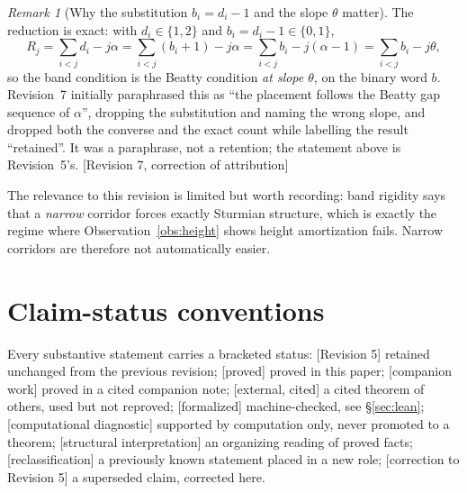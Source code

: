 \documentclass[11pt]{article}
\theoremstyle{plain}
\theoremstyle{definition}
\theoremstyle{remark}
\newtheorem{remark}[theorem]{Remark}
\newcommand{\al}{\alpha}
\newcommand{\status}[1]{\textsf{\footnotesize[#1]}}
\begin{document}
\begin{remark}[Why the substitution $b_i=d_i-1$ and the slope $\theta$ matter]\label{rem:bandslope}
The reduction is exact: with $d_i\in\{1,2\}$ and $b_i=d_i-1\in\{0,1\}$,
\[
R_j=\textstyle\sum_{i<j}d_i-j\al=\sum_{i<j}(b_i+1)-j\al=\sum_{i<j}b_i-j(\al-1)=\sum_{i<j}b_i-j\theta,
\]
so the band condition is the Beatty condition \emph{at slope $\theta$}, on the binary word $b$.
Revision~7 initially paraphrased this as ``the placement follows the Beatty gap sequence of $\al$'',
dropping the substitution and naming the wrong slope, and dropped both the converse and the exact
count while labelling the result ``retained''. It was a paraphrase, not a retention; the statement
above is Revision~5's. \status{Revision 7, correction of attribution}
\end{remark}

The relevance to this revision is limited but worth recording: band rigidity says that a
\emph{narrow} corridor forces exactly Sturmian structure, which is exactly the regime where
Observation~\ref{obs:height} shows height amortization fails. Narrow corridors are therefore not
automatically easier.

\section{Claim-status conventions}\label{sec:status}

Every substantive statement carries a bracketed status:
\textsf{[Revision 5]} retained unchanged from the previous revision;
\textsf{[proved]} proved in this paper;
\textsf{[companion work]} proved in a cited companion note;
\textsf{[external, cited]} a cited theorem of others, used but not reproved;
\textsf{[formalized]} machine-checked, see \S\ref{sec:lean};
\textsf{[computational diagnostic]} supported by computation only, never promoted to a theorem;
\textsf{[structural interpretation]} an organizing reading of proved facts;
\textsf{[reclassification]} a previously known statement placed in a new role;
\textsf{[correction to Revision 5]} a superseded claim, corrected here.
\end{document}
